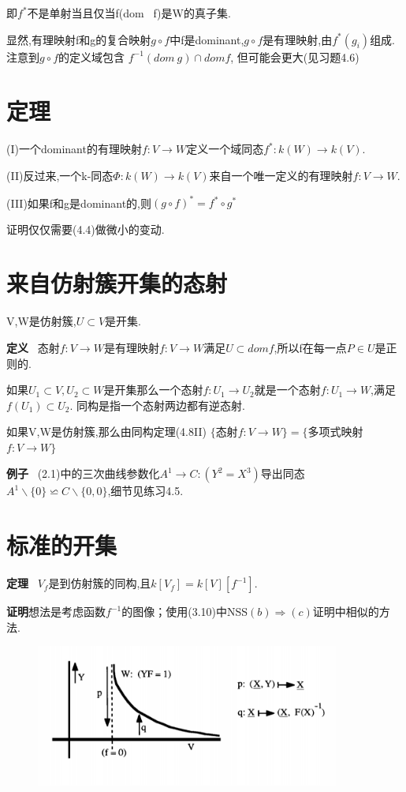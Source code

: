 \documentclass[UTF8]{book}
\begin{document}
		即$f^{*}$不是单射当且仅当f(dom \ f)是W的真子集.

		显然,有理映射f和g的复合映射$g\circ f$中f是dominant,$g\circ f$是有理映射,由$f^{*}(g_{i})$组成.注意到$g\circ f$的定义域包含 $f^{-1}(dom \ g)\cap dom f$, 但可能会更大(见习题4.6)
	\section{定理}
		(I)一个dominant的有理映射$f:V\rightarrow W$定义一个域同态$f^{*}:k(W)\rightarrow k(V)$.

		(II)反过来,一个k-同态$\Phi: k(W)\rightarrow k(V)$来自一个唯一定义的有理映射$f:V\rightarrow W$.

		(III)如果f和g是dominant的,则$(g\circ f)^{*}=f^{*}\circ g^{*}$

		证明仅仅需要(4.4)做微小的变动.

	\section{来自仿射簇开集的态射}
		V,W是仿射簇,$U\subset V$是开集.

		\textbf{定义} \ 态射$f:V\rightarrow W$是有理映射$f:V\rightarrow W$满足$U\subset dom f$,所以f在每一点$P\in U$是正则的.

		如果$U_{1}\subset V,U_{2}\subset W$是开集那么一个态射$f:U_{1}\rightarrow U_{2}$就是一个态射$f:U_{1}\rightarrow W$,满足$f(U_{1})\subset U_{2}$. 同构是指一个态射两边都有逆态射.

		如果V,W是仿射簇,那么由同构定理(4.8II)
		\center  $\{$态射$f:V\rightarrow W\}=\{$多项式映射$f:V\rightarrow W\}$


		\justifying
		\textbf{例子} \ (2.1)中的三次曲线参数化$A^{1} \rightarrow C:(Y^{2}=X^{3}) $导出同态$A^{1}\backslash \{0\}\backsimeq C\backslash \{0,0\}$,细节见练习4.5.


	\section{标准的开集}


		\textbf{定理} \ $V_{f}$是到仿射簇的同构,且$k[V_{f}]=k[V][f^{-1}].$

		\textbf{证明}想法是考虑函数$f^{-1}$的图像；使用(3.10)中NSS$(b)\Rightarrow(c)$证明中相似的方法.
		\begin{figure}[h]
		  \centering
		  \includegraphics[width=10cm]{75.jpg}\\
		\end{figure}
\end{document}
